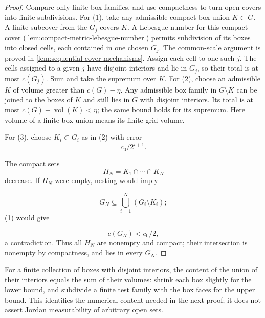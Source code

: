 \begin{proof}
Compare only finite box families, and use compactness to
turn open covers into finite subdivisions.
For (1), take any admissible compact box union $K\subset G$. A finite
subcover from the $G_j$ covers $K$. A Lebesgue number for this compact
cover (\cref{lem:compact-metric-lebesgue-number}) permits subdivision of its boxes into closed cells, each contained
in one chosen $G_j$. The common-scale argument is proved in
\cref{lem:sequential-cover-mechanisms}. Assign each cell to one such $j$.
The cells assigned to a given $j$ have disjoint interiors and lie in $G_j$,
so their total is at most $c(G_j)$. Sum and take the supremum over $K$.
For (2), choose an admissible $K$ of volume greater than $c(G)-\eta$.
Any admissible box family in $G\setminus K$ can be joined to the boxes
of $K$ and still lies in $G$ with disjoint interiors. Its total is at
most $c(G)-\operatorname{vol}(K)<\eta$; the same bound holds for its
supremum. Here volume of a finite box union means its finite grid volume.

For (3), choose $K_i\subset G_i$ as in (2) with error
\[
c_0/2^{i+1}.
\]

The compact sets
\[
H_N=K_1\cap\cdots\cap K_N
\]
 decrease. If $H_N$ were
empty, nesting would imply

\[
G_N\subseteq\bigcup_{i=1}^N(G_i\setminus K_i);
\]
 (1) would give

\[
c(G_N)<c_0/2,
\]
 a contradiction. Thus all $H_N$ are nonempty and
compact; their intersection is nonempty by compactness, and lies in every $G_N$.
\end{proof}
For a finite collection of boxes with disjoint interiors, the content of
the union of their interiors equals the sum of their volumes: shrink each
box slightly for the lower bound, and subdivide a finite test family with
the box faces for the upper bound. This identifies the numerical content
needed in the next proof; it does not assert Jordan measurability of arbitrary open sets.

